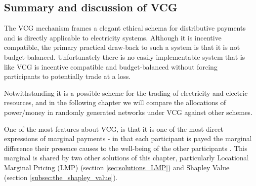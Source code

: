 



\DIFaddend \subsection{Summary and discussion of VCG}\label{subsec:summary_discussion_VCG}

The VCG mechanism frames a elegant ethical schema for distributive payments and is directly applicable to electricity systems.
Although it is incentive compatible, the primary practical draw-back to such a system is that it is not budget-balanced.
Unfortunately there is no easily implementable system that is like VCG \DIFdelbegin {}\DIFdelend \DIFaddbegin {}\DIFaddend is incentive compatible and \DIFdelbegin {}\DIFdelend budget-balanced without forcing participants to potentially trade at a loss.

Notwithstanding it is a possible scheme for the trading of electricity and electric resources, and in the following chapter we will compare the allocations of power/money in randomly generated networks under VCG against other schemes.

One of the most \DIFaddbegin {}\DIFaddend features about VCG, is that it is one of the most direct expressions of marginal payments - in that each participant is payed the marginal difference their presence causes to the well-being of the other participants \DIFaddbegin {}\DIFaddend .
This marginal \DIFdelbegin {}\DIFdelend \DIFaddbegin {}\DIFaddend is shared by two other solutions of this chapter, particularly Locational Marginal Pricing (LMP) (section \ref{sec:solutions_LMP}) and Shapley Value (section \ref{subsec:the_shapley_value}).

